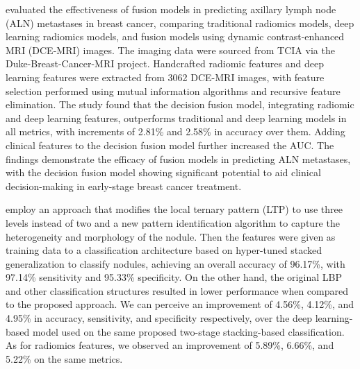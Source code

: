 \citet{li_comparison_2022} evaluated the effectiveness of fusion models in predicting axillary lymph node (ALN) metastases in breast cancer, comparing traditional radiomics models, deep learning radiomics models, and fusion models using dynamic contrast-enhanced MRI (DCE-MRI) images. The imaging data were sourced from TCIA via the Duke-Breast-Cancer-MRI project. Handcrafted radiomic features and deep learning features were extracted from 3062 DCE-MRI images, with feature selection performed using mutual information algorithms and recursive feature elimination. The study found that the decision fusion model, integrating radiomic and deep learning features, outperforms traditional and deep learning models in all metrics, with increments of 2.81\% and 2.58\% in accuracy over them.
Adding clinical features to the decision fusion model further increased the AUC. The findings demonstrate the efficacy of fusion models in predicting ALN metastases, with the decision fusion model showing significant potential to aid clinical decision-making in early-stage breast cancer treatment.

\citet{alksas_novel_2023} employ an approach that modifies the local ternary pattern (LTP) to use three levels instead of two and a new pattern identification algorithm to capture the heterogeneity and morphology of the nodule. Then the features were given as training data to a classification architecture based on hyper-tuned stacked generalization to classify nodules, achieving an overall accuracy of 96.17\%, with 97.14\% sensitivity and 95.33\% specificity. On the other hand, the original LBP and other classification structures resulted in lower performance when compared to the proposed approach.
We can perceive an improvement of 4.56\%, 4.12\%, and 4.95\% in accuracy, sensitivity, and specificity respectively, over the deep learning-based model used on the same proposed two-stage stacking-based classification. As for radiomics features, we observed an improvement of 5.89\%, 6.66\%, and 5.22\% on the same metrics.

